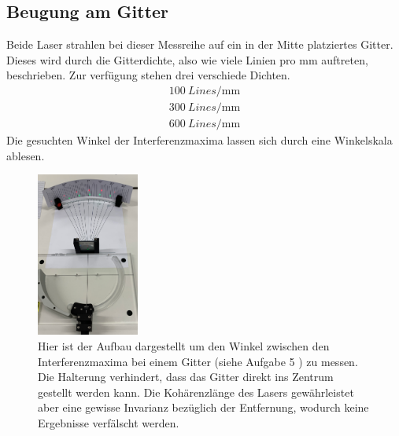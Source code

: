 \subsection{Beugung am Gitter}
Beide Laser strahlen bei dieser Messreihe auf ein in der Mitte platziertes Gitter. Dieses wird durch die Gitterdichte, also wie viele
Linien pro $\si{\milli\meter}$ auftreten, beschrieben. Zur verfügung stehen drei verschiede Dichten. 
\begin{align*}
    \SI{100}{Lines \per \milli\meter} \\
    \SI{300}{Lines \per \milli\meter} \\
    \SI{600}{Lines \per \milli\meter} 
\end{align*}
Die gesuchten Winkel der Interferenzmaxima lassen sich durch eine Winkelskala ablesen.
    \begin{figure}
        \centering
        \includegraphics[width=0.3\textwidth]{bilder/gitter.png}
        \caption{Hier ist der Aufbau dargestellt um den Winkel zwischen den Interferenzmaxima bei einem Gitter
        (siehe Aufgabe 5 \cite{skript}) zu messen. Die Halterung verhindert, dass das Gitter direkt ins Zentrum gestellt werden kann.
        Die Kohärenzlänge des Lasers gewährleistet aber eine gewisse Invarianz bezüglich der Entfernung, wodurch keine Ergebnisse verfälscht werden.}
\end{figure}




